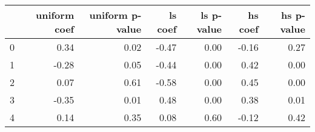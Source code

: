 \begin{tabular}{lrrrrrr}
\toprule
 & uniform coef & uniform p-value & ls coef & ls p-value & hs coef & hs p-value \\
\midrule
0 & 0.34 & 0.02 & -0.47 & 0.00 & -0.16 & 0.27 \\
1 & -0.28 & 0.05 & -0.44 & 0.00 & 0.42 & 0.00 \\
2 & 0.07 & 0.61 & -0.58 & 0.00 & 0.45 & 0.00 \\
3 & -0.35 & 0.01 & 0.48 & 0.00 & 0.38 & 0.01 \\
4 & 0.14 & 0.35 & 0.08 & 0.60 & -0.12 & 0.42 \\
\bottomrule
\end{tabular}
